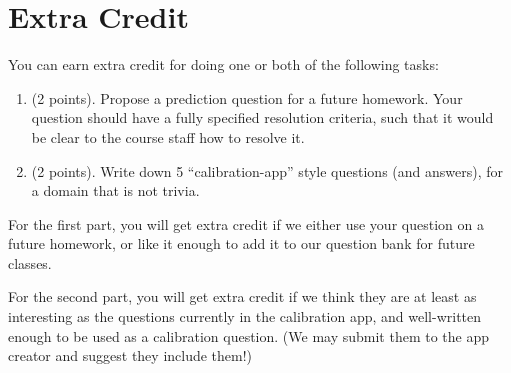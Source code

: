 \documentclass[11pt]{article}
\begin{document}
\section*{Extra Credit}

You can earn extra credit for doing one or both of the following tasks:
\begin{enumerate}
\item (2 points). Propose a prediction question for a future homework. Your question should have a fully specified resolution criteria, 
      such that it would be clear to the course staff how to resolve it.
\item (2 points). Write down 5 ``calibration-app'' style questions (and answers), for a domain that is not trivia.
\end{enumerate}

For the first part, you will get extra credit if we either use your question on a future homework, 
or like it enough to add it to our question bank for future classes.

For the second part, you will get extra credit if we think they are at least as interesting as the 
questions currently in the calibration app, and well-written enough to be used as a calibration question. 
(We may submit them to the app creator and suggest they include them!)
\end{document}
